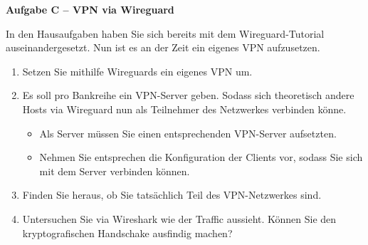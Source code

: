 \documentclass[paper=a4,fontsize=11pt]{scrartcl}%
\numberwithin{equation}{section}
\begin{document}
\begin{center}\Large{\textbf{Aufgabe C -- VPN via Wireguard}}\end{center}\vskip0.25in
In den Hausaufgaben haben Sie sich bereits mit dem Wireguard-Tutorial auseinandergesetzt. Nun ist es an der Zeit ein eigenes VPN aufzusetzen.
\begin{enumerate}
	\item Setzen Sie mithilfe Wireguards ein eigenes VPN um.
	\item Es soll pro Bankreihe ein VPN-Server geben. Sodass sich theoretisch andere Hosts via Wireguard nun als Teilnehmer des Netzwerkes verbinden könne.
	\begin{itemize}
		\item Als Server müssen Sie einen entsprechenden VPN-Server aufsetzten. 
		\item Nehmen Sie entsprechen die Konfiguration der Clients vor, sodass Sie sich mit dem Server verbinden können.
	\end{itemize}
	\item Finden Sie heraus, ob Sie tatsächlich Teil des VPN-Netzwerkes sind.
	\item Untersuchen Sie via Wireshark wie der Traffic aussieht. Können Sie den kryptografischen Handschake ausfindig machen?
\end{enumerate}
\end{document}
